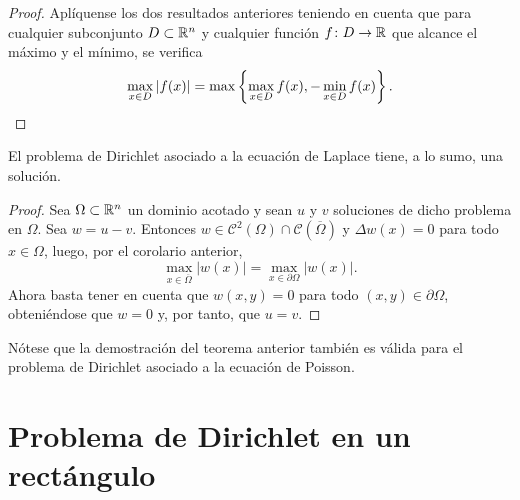 \documentclass[a4paper, 12pt, extrafontsizes]{memoir}
\begin{document}
\begin{proof}
    Aplíquense los dos resultados anteriores teniendo en cuenta que para cualquier subconjunto $D \subset \mathbb R^n$ y cualquier función $f \colon D \to \mathbb R$ que alcance el máximo y el mínimo, se verifica
    \[\max_{x \in D} |f(x)| = \max\left\{\max_{x \in D}f(x),-\min_{x \in D}f(x)\right\}. \qedhere\]
\end{proof}

\begin{theorem}
    El problema de Dirichlet asociado a la ecuación de Laplace tiene, a lo sumo, una solución.
\end{theorem}

\begin{proof}
    Sea $\Omega \subset \mathbb R^n$ un dominio acotado y sean $u$ y $v$ soluciones de dicho problema en $\Omega$. Sea $w = u-v$. Entonces $w \in \mathcal{C}^2(\Omega) \cap \mathcal{C}(\overline{\Omega})$ y $\Delta w(x) = 0$ para todo $x \in \Omega$, luego, por el corolario anterior,
    \[\max_{x \in \overline{\Omega}} |w(x)| = \max_{x \in \partial \Omega} |w(x)|.\]
    Ahora basta tener en cuenta que $w(x,y) = 0$ para todo $(x,y) \in \partial \Omega$, obteniéndose que $w = 0$ y, por tanto, que $u = v$.
\end{proof}

Nótese que la demostración del teorema anterior también es válida para el problema de Dirichlet asociado a la ecuación de Poisson.


\section{Problema de Dirichlet en un rectángulo}
\end{document}
